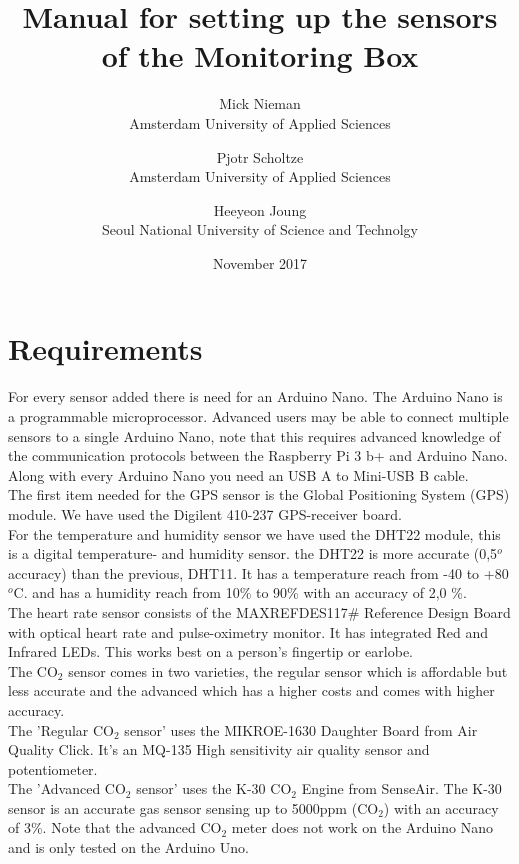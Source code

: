 \documentclass{report}
\title{Manual for setting up the sensors of the Monitoring Box}
\author{Mick Nieman \\ Amsterdam University of Applied Sciences \and Pjotr Scholtze \\ Amsterdam University of Applied Sciences \and Heeyeon Joung \\ Seoul National University of Science and Technolgy}
\date{November 2017}
\begin{document}
\maketitle


\tableofcontents


\chapter{Requirements}
For every sensor added there is need for an Arduino Nano. The Arduino Nano is a programmable microprocessor. Advanced users may be able to connect multiple sensors to a single Arduino Nano, note that this requires advanced knowledge of the communication protocols between the Raspberry Pi 3 b+ and Arduino Nano. Along with every Arduino Nano you need an USB A to Mini-USB B cable.  \\

The first item needed for the GPS sensor is the Global Positioning System (GPS) module. We have used the Digilent 410-237 GPS-receiver board. \\

For the temperature and humidity sensor we have used the DHT22 module, this is a digital temperature- and humidity sensor. the DHT22 is more accurate (0,5$^o$ accuracy) than the previous, DHT11. It has a temperature reach from -40 to +80 $^o$C. and has a humidity reach from 10\% to 90\% with an accuracy of 2,0 \%.  \\

The heart rate sensor consists of the MAXREFDES117\# Reference Design Board with optical heart rate and pulse-oximetry monitor. It has integrated Red and Infrared LEDs. This works best on a person's fingertip or earlobe. \\

The CO$_2$ sensor comes in two varieties, the regular sensor which is affordable but less accurate and the advanced which has a higher costs and comes with higher accuracy. \\
The 'Regular CO$_2$ sensor' uses the MIKROE-1630 Daughter Board from Air Quality Click. It's an MQ-135 High sensitivity air quality sensor and potentiometer. \\
The 'Advanced CO$_2$ sensor' uses the K-30 CO$_2$ Engine from SenseAir. The K-30 sensor is an accurate gas sensor sensing up to 5000ppm (CO$_2$) with an accuracy of 3\%. Note that the advanced CO$_2$ meter does not work on the Arduino Nano and is only tested on the Arduino Uno. \\
\end{document}
